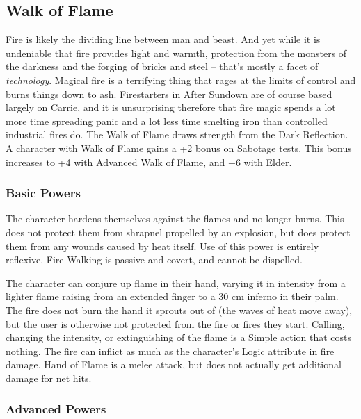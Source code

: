 \subsection{Walk of Flame}

Fire is likely the dividing line between man and beast. And yet while it is undeniable that fire provides light and warmth, protection from the monsters of the darkness and the forging of bricks and steel -- that's mostly a facet of \textit{technology}. Magical fire is a terrifying thing that rages at the limits of control and burns things down to ash. Firestarters in After Sundown are of course based largely on Carrie, and it is unsurprising therefore that fire magic spends a lot more time spreading panic and a lot less time smelting iron than controlled industrial fires do. The Walk of Flame draws strength from the Dark Reflection. A character with Walk of Flame gains a +2 bonus on Sabotage tests. This bonus increases to +4 with Advanced Walk of Flame, and +6 with Elder.

\subsubsection{Basic Powers}

 The character hardens themselves against the flames and no longer burns. This does not protect them from shrapnel propelled by an explosion, but does protect them from any wounds caused by heat itself. Use of this power is entirely reflexive. Fire Walking is passive and covert, and cannot be dispelled.

 The character can conjure up flame in their hand, varying it in intensity from a lighter flame raising from an extended finger to a 30 cm inferno in their palm. The fire does not burn the hand it sprouts out of (the waves of heat move away), but the user is otherwise not protected from the fire or fires they start. Calling, changing the intensity, or extinguishing of the flame is a Simple action that costs nothing. The fire can inflict as much as the character's Logic attribute in fire damage. Hand of Flame is a melee attack, but does not actually get additional damage for net hits.

\subsubsection{Advanced Powers}

